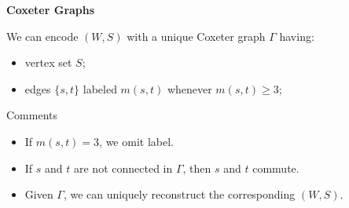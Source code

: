 \documentclass{beamer}
\begin{document}

\begin{frame}{\textbf{Coxeter Graphs}}

\begin{definition}
We can encode $(W,S)$ with a unique \alert{Coxeter graph} $\Gamma$ having: 

\begin{itemize}
\item vertex set $S$;

\item edges $\{s,t\}$ labeled $m(s,t)$ whenever $m(s,t)\geq 3;$



\end{itemize}

\vspace{-1em}

\end{definition}

\pause

\begin{block}{Comments}
\begin{itemize}

\item If $m(s,t)=3$, we omit label.

\item If $s$ and $t$ are not connected in $\Gamma$, then $s$ and $t$ 
commute.

\item Given $\Gamma$, we can uniquely reconstruct the corresponding $(W,S)
$. 

\end{itemize}

\end{block}

\end{frame}

\end{document}
